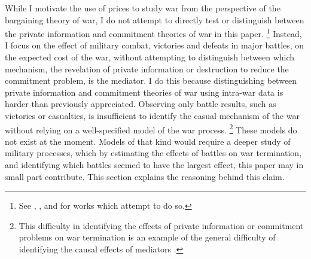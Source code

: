 While I motivate the use of prices to study war from the perspective of the bargaining theory of war, I do not attempt to directly test or distinguish between the private information and commitment theories of war in this paper.%
\footnote{See \textcite{Ramsay2008}, \textcite{Weisiger2015}, and \textcite{Reiter2009} for works which attempt to do so.}
Instead, I focus on the effect of military combat, victories and defeats in major battles, on the expected cost of the war, without attempting to distinguish between which mechanism, the revelation of private information or destruction to reduce the commitment problem, is the mediator.
I do this because distinguishing between private information and commitment theories of war using intra-war data is harder than previously appreciated.
Observing only battle results, such as victories or casualties, is insufficient to identify the casual mechanism of the war without relying on a well-specified model of the war process.%
\footnote{This difficulty in identifying the effects of private information or commitment problems on war termination is an example of the general difficulty of identifying the causal effects of mediators \parencite{Keele2015a}.}
These models do not exist at the moment.
Models of that kind would require a deeper study of military processes, which by estimating the effects of battles on war termination, and identifying which battles seemed to have the largest effect, this paper may in small part contribute.
This section explains the reasoning behind this claim.

